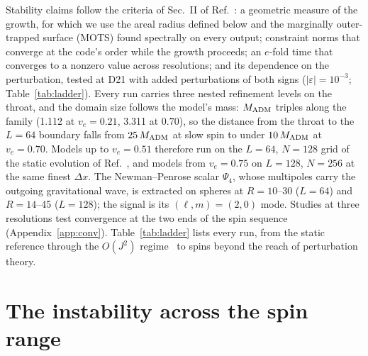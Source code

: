 \documentclass[twocolumn,floatfix,aps,prd,superscriptaddress,nofootinbib]{revtex4-2}
\begin{document}
Stability claims follow the criteria of Sec.~II of Ref.~\cite{evstafyeva2025}: a geometric measure of the growth, for which we use the areal radius defined below and the marginally outer-trapped surface (MOTS) found spectrally on every output; constraint norms that converge at the code's order while the growth proceeds; an $e$-fold time that converges to a nonzero value across resolutions; and its dependence on the perturbation, tested at D21 with added perturbations of both signs ($|\varepsilon|=10^{-3}$; Table~\ref{tab:ladder}). Every run carries three nested refinement levels on the throat, and the domain size follows the model's mass: $M_{\rm ADM}$ triples along the family (1.112 at $v_e=0.21$, 3.311 at $0.70$), so the distance from the throat to the $L=64$ boundary falls from $25\,M_{\rm ADM}$ at slow spin to under $10\,M_{\rm ADM}$ at $v_e=0.70$. Models up to $v_e=0.51$ therefore run on the $L=64$, $N=128$ grid of the static evolution of Ref.~\cite{shirokov2026c}, and models from $v_e=0.75$ on $L=128$, $N=256$ at the same finest $\Delta x$. The Newman--Penrose scalar $\Psi_4$, whose multipoles carry the outgoing gravitational wave, is extracted on spheres at $R=10$--30 ($L=64$) and $R=14$--45 ($L=128$); the signal is its $(\ell,m)=(2,0)$ mode. Studies at three resolutions test convergence at the two ends of the spin sequence (Appendix~\ref{app:conv}). Table~\ref{tab:ladder} lists every run, from the static reference through the $O(J^2)$ regime~\cite{azad2023,azad2024} to spins beyond the reach of perturbation theory.

\section{The instability across the spin range}
\label{sec:slow}
\end{document}
